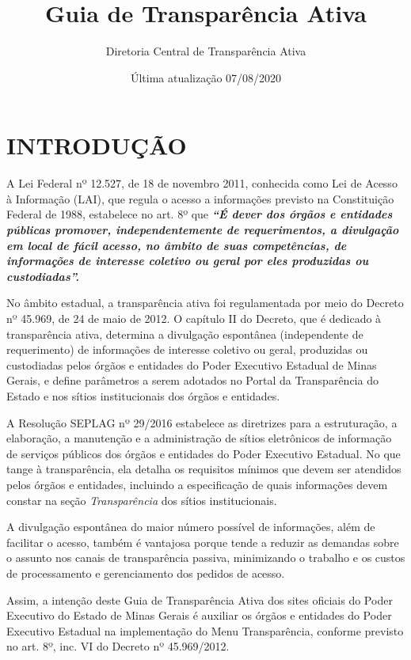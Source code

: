 \documentclass[
]{book}
\title{Guia de Transparência Ativa}
\author{Diretoria Central de Transparência Ativa}
\date{Última atualização 07/08/2020}
\begin{document}
\maketitle

{
\setcounter{tocdepth}{1}
\tableofcontents
}
\hypertarget{introduuxe7uxe3o}{%
\chapter{INTRODUÇÃO}\label{introduuxe7uxe3o}}

A Lei Federal nº 12.527, de 18 de novembro 2011, conhecida como Lei de Acesso à Informação (LAI), que regula o acesso a informações previsto na Constituição Federal de 1988, estabelece no art. 8º que \textbf{\emph{``É dever dos órgãos e entidades públicas promover, independentemente de requerimentos, a divulgação em local de fácil acesso, no âmbito de suas competências, de informações de interesse coletivo ou geral por eles produzidas ou custodiadas''.}}

No âmbito estadual, a transparência ativa foi regulamentada por meio do Decreto nº 45.969, de 24 de maio de 2012. O capítulo II do Decreto, que é dedicado à transparência ativa, determina a divulgação espontânea (independente de requerimento) de informações de interesse coletivo ou geral, produzidas ou custodiadas pelos órgãos e entidades do Poder Executivo Estadual de Minas Gerais, e define parâmetros a serem adotados no Portal da Transparência do Estado e nos sítios institucionais dos órgãos e entidades.

A Resolução SEPLAG nº 29/2016 estabelece as diretrizes para a estruturação, a elaboração, a manutenção e a administração de sítios eletrônicos de informação de serviços públicos dos órgãos e entidades do Poder Executivo Estadual. No que tange à transparência, ela detalha os requisitos mínimos que devem ser atendidos pelos órgãos e entidades, incluindo a especificação de quais informações devem constar na seção \emph{Transparência} dos sítios institucionais.

A divulgação espontânea do maior número possível de informações, além de facilitar o acesso, também é vantajosa porque tende a reduzir as demandas sobre o assunto nos canais de transparência passiva, minimizando o trabalho e os custos de processamento e gerenciamento dos pedidos de acesso.

Assim, a intenção deste Guia de Transparência Ativa dos sites oficiais do Poder Executivo do Estado de Minas Gerais é auxiliar os órgãos e entidades do Poder Executivo Estadual na implementação do Menu Transparência, conforme previsto no art. 8º, inc. VI do Decreto nº 45.969/2012.
\end{document}
